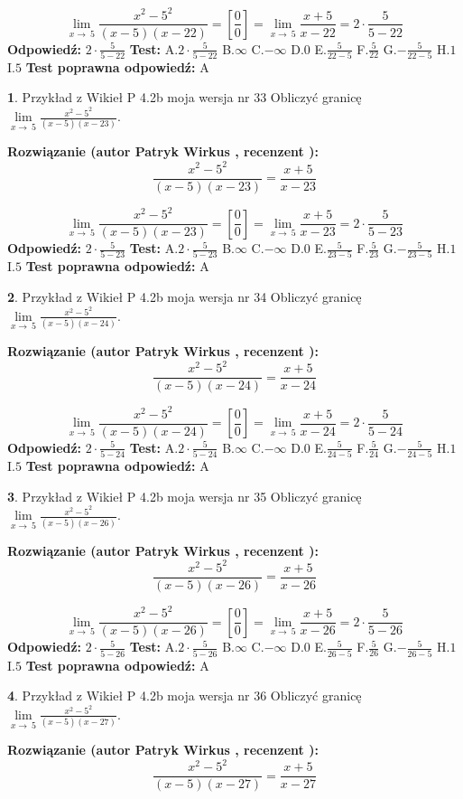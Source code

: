 \documentclass[12pt, a4paper]{article}
\theoremstyle{definition} %
\newtheorem{zad}{}
\newcommand{\zadStart}[1]{\begin{zad}#1\newline}
\newcommand{\zadStop}{\end{zad}}
\newcommand{\rozwStart}[2]{\noindent \textbf{Rozwiązanie (autor #1 , recenzent #2): }\newline}
\newcommand{\rozwStop}{\newline}
\newcommand{\odpStart}{\noindent \textbf{Odpowiedź:}\newline}
\newcommand{\odpStop}{\newline}
\newcommand{\testStart}{\noindent \textbf{Test:}\newline}
\newcommand{\testStop}{\newline}
\newcommand{\kluczStart}{\noindent \textbf{Test poprawna odpowiedź:}\newline}
\newcommand{\kluczStop}{\newline}
\begin{document}
$$\lim\limits_{x\to\ 5}\frac{x^{2}-5^{2}}{(x-5)(x-22)}=[\frac{0}{0}]=\lim\limits_{x\to\ 5}\frac{x+5}{x-22}=2 \cdot \frac{5}{5-22}$$
\rozwStop
\odpStart
$2 \cdot \frac{5}{5-22}$
\odpStop
\testStart
A.$2 \cdot \frac{5}{5-22}$
B.$\infty$
C.$-\infty$
D.$0$
E.$\frac{5}{22-5}$
F.$\frac{5}{22}$
G.$-\frac{5}{22-5}$
H.$1$
I.$5$
\testStop
\kluczStart
A
\kluczStop



\zadStart{Przykład z Wikieł P 4.2b moja wersja nr 33}
Obliczyć granicę $\lim\limits_{x\to\ 5}\frac{x^{2}-5^{2}}{(x-5)(x-23)}$.
\zadStop
\rozwStart{Patryk Wirkus}{}
$$\frac{x^{2}-5^{2}}{(x-5)(x-23)}=\frac{x+5}{x-23}$$

$$\lim\limits_{x\to\ 5}\frac{x^{2}-5^{2}}{(x-5)(x-23)}=[\frac{0}{0}]=\lim\limits_{x\to\ 5}\frac{x+5}{x-23}=2 \cdot \frac{5}{5-23}$$
\rozwStop
\odpStart
$2 \cdot \frac{5}{5-23}$
\odpStop
\testStart
A.$2 \cdot \frac{5}{5-23}$
B.$\infty$
C.$-\infty$
D.$0$
E.$\frac{5}{23-5}$
F.$\frac{5}{23}$
G.$-\frac{5}{23-5}$
H.$1$
I.$5$
\testStop
\kluczStart
A
\kluczStop



\zadStart{Przykład z Wikieł P 4.2b moja wersja nr 34}
Obliczyć granicę $\lim\limits_{x\to\ 5}\frac{x^{2}-5^{2}}{(x-5)(x-24)}$.
\zadStop
\rozwStart{Patryk Wirkus}{}
$$\frac{x^{2}-5^{2}}{(x-5)(x-24)}=\frac{x+5}{x-24}$$

$$\lim\limits_{x\to\ 5}\frac{x^{2}-5^{2}}{(x-5)(x-24)}=[\frac{0}{0}]=\lim\limits_{x\to\ 5}\frac{x+5}{x-24}=2 \cdot \frac{5}{5-24}$$
\rozwStop
\odpStart
$2 \cdot \frac{5}{5-24}$
\odpStop
\testStart
A.$2 \cdot \frac{5}{5-24}$
B.$\infty$
C.$-\infty$
D.$0$
E.$\frac{5}{24-5}$
F.$\frac{5}{24}$
G.$-\frac{5}{24-5}$
H.$1$
I.$5$
\testStop
\kluczStart
A
\kluczStop



\zadStart{Przykład z Wikieł P 4.2b moja wersja nr 35}
Obliczyć granicę $\lim\limits_{x\to\ 5}\frac{x^{2}-5^{2}}{(x-5)(x-26)}$.
\zadStop
\rozwStart{Patryk Wirkus}{}
$$\frac{x^{2}-5^{2}}{(x-5)(x-26)}=\frac{x+5}{x-26}$$

$$\lim\limits_{x\to\ 5}\frac{x^{2}-5^{2}}{(x-5)(x-26)}=[\frac{0}{0}]=\lim\limits_{x\to\ 5}\frac{x+5}{x-26}=2 \cdot \frac{5}{5-26}$$
\rozwStop
\odpStart
$2 \cdot \frac{5}{5-26}$
\odpStop
\testStart
A.$2 \cdot \frac{5}{5-26}$
B.$\infty$
C.$-\infty$
D.$0$
E.$\frac{5}{26-5}$
F.$\frac{5}{26}$
G.$-\frac{5}{26-5}$
H.$1$
I.$5$
\testStop
\kluczStart
A
\kluczStop



\zadStart{Przykład z Wikieł P 4.2b moja wersja nr 36}
Obliczyć granicę $\lim\limits_{x\to\ 5}\frac{x^{2}-5^{2}}{(x-5)(x-27)}$.
\zadStop
\rozwStart{Patryk Wirkus}{}
$$\frac{x^{2}-5^{2}}{(x-5)(x-27)}=\frac{x+5}{x-27}$$
\end{document}
